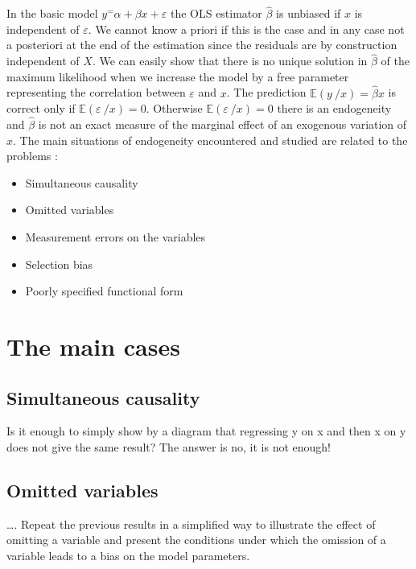 \documentclass[
]{report}
\providecommand{\tightlist}{%
  \setlength{\itemsep}{0pt}\setlength{\parskip}{0pt}}
\begin{document}
In the basic model \(y^=\alpha+\beta x+\varepsilon\) the OLS estimator \(\hat{\beta}\) is unbiased if \(x\) is independent of \(\varepsilon\). We cannot know a priori if this is the case and in any case not a posteriori at the end of the estimation since the residuals are by construction independent of \(X\). We can easily show that there is no unique solution in \(\hat{\beta}\) of the maximum likelihood when we increase the model by a free parameter representing the correlation between \(\varepsilon\) and \(x\).
The prediction \(\mathbb{E}(y~/x)=\hat{\beta}x\) is correct only if \(\mathbb{E}(\varepsilon~/x)=0\).
Otherwise \(\mathbb{E}(\varepsilon~/x)=0\) there is an endogeneity and \(\hat{\beta}\) is not an exact measure of the marginal effect of an exogenous variation of \(x\).
The main situations of endogeneity encountered and studied are related to the problems :

\begin{itemize}
\tightlist
\item
  Simultaneous causality
\item
  Omitted variables
\item
  Measurement errors on the variables
\item
  Selection bias
\item
  Poorly specified functional form
\end{itemize}

\hypertarget{the-main-cases}{%
\section{The main cases}\label{the-main-cases}}

\hypertarget{simultaneous-causality}{%
\subsection{Simultaneous causality}\label{simultaneous-causality}}

Is it enough to simply show by a diagram that regressing y on x and then x on y does not give the same result?
The answer is no, it is not enough!

\hypertarget{omitted-variables}{%
\subsection{Omitted variables}\label{omitted-variables}}

\ldots. Repeat the previous results in a simplified way to illustrate the effect of omitting a variable and present the conditions under which the omission of a variable leads to a bias on the model parameters.
\end{document}
